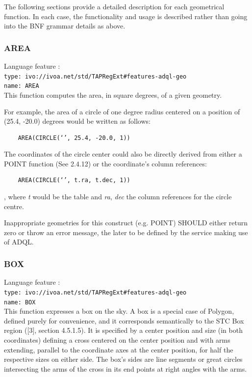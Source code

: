\documentclass[11pt,a4paper]{ivoa}
\begin{document}
The following sections provide a detailed description for each geometrical
function. In each case, the functionality and usage is described rather
than going into the BNF grammar details as above.

\subsubsection{AREA}
\label{sec:geom.functions.area}
{\footnotesize Language feature :}\\
{\footnotesize \verb|type: ivo://ivoa.net/std/TAPRegExt#features-adql-geo|}\\
{\footnotesize \verb|name: AREA|}\\

This function computes the area, in square degrees, of a given geometry.

For example, the area of a circle of one degree radius centered on a position
of (25.4, -20.0) degrees would be written as follows:

\begin{verbatim}
    AREA(CIRCLE(‘’, 25.4, -20.0, 1))
\end{verbatim}

The coordinates of the circle center could also be directly derived from
either a POINT function (See 2.4.12) or the coordinate’s column references:

\begin{verbatim}
    AREA(CIRCLE(‘’, t.ra, t.dec, 1))
\end{verbatim}

, where \textit{t} would be the table and \textit{ra}, \textit{dec} the
column references for the circle centre.

Inappropriate geometries for this construct (e.g. POINT) SHOULD either return
zero or throw an error message, the later to be defined by the service making
use of ADQL.

\subsubsection{BOX}
\label{sec:geom.functions.box}
{\footnotesize Language feature :}\\
{\footnotesize \verb|type: ivo://ivoa.net/std/TAPRegExt#features-adql-geo|}\\
{\footnotesize \verb|name: BOX|}\\

This function expresses a box on the sky. A box is a special case of Polygon,
defined purely for convenience, and it corresponds semantically to the STC Box
region ([3], section 4.5.1.5). It is specified by a center position and size
(in both coordinates) defining a cross centered on the center position and
with arms extending, parallel to the coordinate axes at the center position,
for half the respective sizes on either side. The box’s sides are line
segments or great circles intersecting the arms of the cross in its end
points at right angles with the arms.
\end{document}
